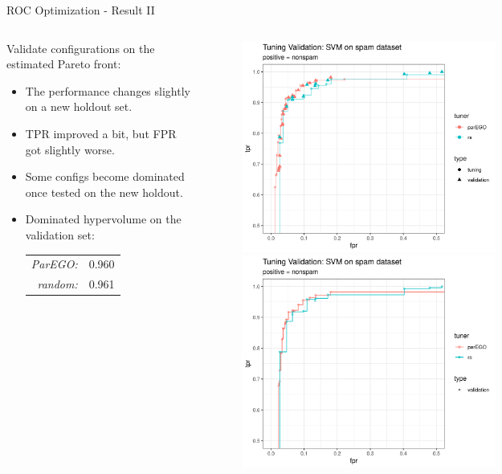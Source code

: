 \documentclass[11pt,compress,t,notes=noshow,xcolor=table]{beamer}
\begin{document}
\begin{vbframe}{ROC Optimization - Result II}

\begin{columns}
\begin{column}{0.42\textwidth}
Validate configurations on the estimated Pareto front:
\begin{itemize}
  \item The performance changes slightly on a new holdout set.
  \item TPR improved a bit, but FPR got slightly worse.
  \item Some configs become dominated once tested on the new holdout.
  \item Dominated hypervolume on the validation set:
  \begin{tabular}{rl}
    \emph{ParEGO:} & 0.960\\
    \emph{random:} & 0.961
  \end{tabular}
\end{itemize}
\end{column}
\begin{column}{0.65\textwidth}
\vspace{-0.2cm}
\begin{figure}
\includegraphics[width=0.6\textwidth]{figure_man/example_parego_spam_outer.png}\\
\includegraphics[width=0.6\textwidth]{figure_man/example_parego_spam_outer_pareto.png}
\end{figure}
\end{column}
\end{columns}

\end{vbframe}
\end{document}

